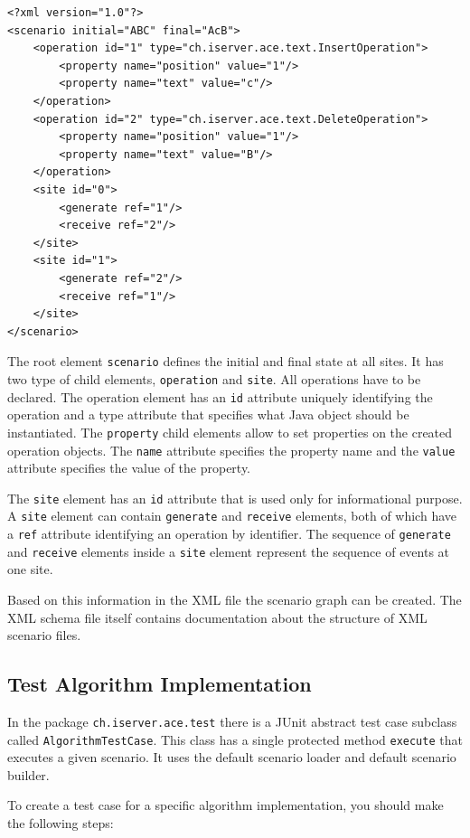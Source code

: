 \documentclass[11pt,a4paper]{article}
\begin{document}
\begin{verbatim}
<?xml version="1.0"?>
<scenario initial="ABC" final="AcB">
    <operation id="1" type="ch.iserver.ace.text.InsertOperation">
        <property name="position" value="1"/>
        <property name="text" value="c"/>
    </operation>
    <operation id="2" type="ch.iserver.ace.text.DeleteOperation">
        <property name="position" value="1"/>
        <property name="text" value="B"/>
    </operation>
    <site id="0">
        <generate ref="1"/>
        <receive ref="2"/>
    </site>
    <site id="1">
        <generate ref="2"/>
        <receive ref="1"/>
    </site>
</scenario>
\end{verbatim}

The root element \texttt{scenario} defines the initial and final state at all sites. It has two type of child elements, \texttt{operation} and \texttt{site}. All operations have to be declared. The operation element has an \texttt{id} attribute uniquely identifying the operation and a type attribute that specifies what Java object should be instantiated. The \texttt{property} child elements allow to set properties on the created operation objects. The \texttt{name} attribute specifies the property name and the \texttt{value} attribute specifies the value of the property.

The \texttt{site} element has an \texttt{id} attribute that is used only for informational purpose. A \texttt{site} element can contain \texttt{generate} and \texttt{receive} elements, both of which have a \texttt{ref} attribute identifying an operation by identifier. The sequence of \texttt{generate} and \texttt{receive} elements inside a \texttt{site} element represent the sequence of events at one site. 

Based on this information in the XML file the scenario graph can be created. The XML schema file itself contains documentation about the structure of XML scenario files.


\subsection{Test Algorithm Implementation}
In the package \texttt{ch.iserver.ace.test} there is a JUnit abstract test case subclass called \texttt{AlgorithmTestCase}. This class has a single protected method \texttt{execute} that executes a given scenario. It uses the default scenario loader and default scenario builder. 

To create a test case for a specific algorithm implementation, you should make the following steps:
\end{document}
